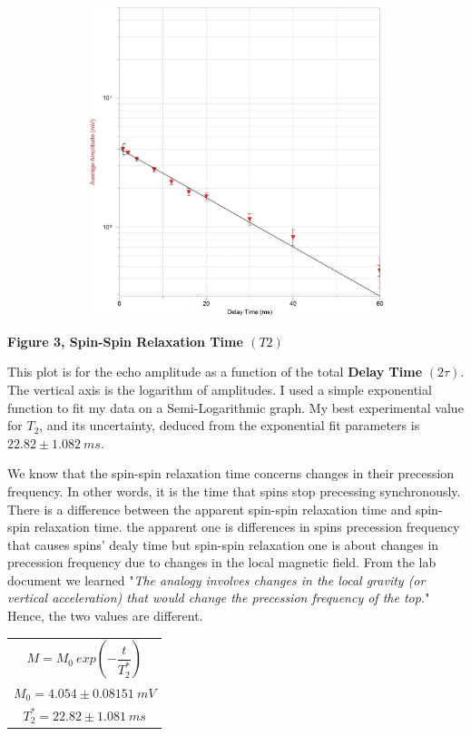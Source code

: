\documentclass[fleqn]{article}
\begin{document}
  \pagebreak

  \includegraphics[height=9cm, width=14cm]{Fig3.JPG}

  \textbf{Figure 3, Spin-Spin Relaxation Time $(T2)$}

  \vspace{10px}

  This plot is for the echo amplitude as a function of the total \textbf{Delay Time} $(2 \tau)$. The vertical axis is 
  the logarithm of amplitudes. I used a simple exponential function to fit my data on a Semi-Logarithmic graph. My best experimental value for $T_2$, and its uncertainty, deduced from the
  exponential fit parameters is $22.82 \pm 1.082 ~ ms$. 
  
  We know that the spin-spin relaxation time concerns changes in their precession frequency. In other words, it is the time that spins stop precessing
  synchronously. There is a difference between the apparent spin-spin relaxation time and  spin-spin relaxation time. the apparent one is 
  differences in spins precession frequency that causes spins' dealy time but spin-spin relaxation one is about changes in precession frequency 
  due to changes in the local magnetic field. From the lab document we learned "\emph{The analogy involves changes in
  the local gravity (or vertical acceleration) that would change the precession frequency of the top.}" Hence, the two values are different.

  \begin{center}
    \begin{tabular}{ |c| } 
     \hline
     $M=M_0 ~ exp \left(-\dfrac{t}{T_2^*}\right)$  \\ 
     $M_0=4.054 \pm 0.08151 ~ mV$ \\ 
     $T_2^*=22.82 \pm 1.081 ~  ms$ \\
     \hline
    \end{tabular}
  \end{center}
\end{document}
